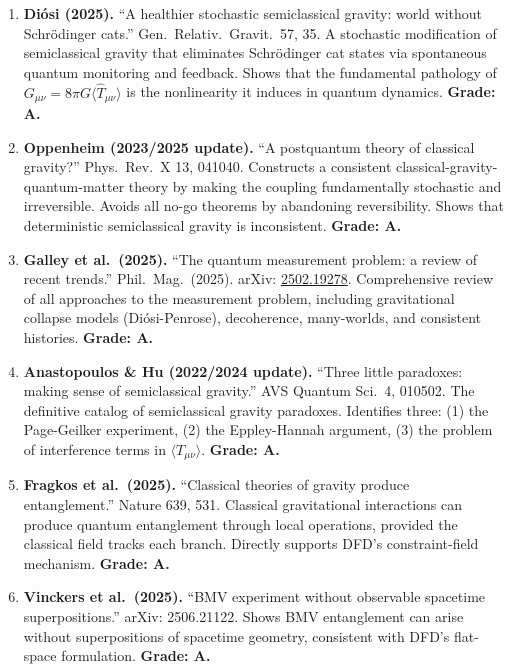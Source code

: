 \documentclass[11pt,a4paper]{article}
\begin{document}
\begin{enumerate}
\item \textbf{Di\'osi (2025).} ``A healthier stochastic semiclassical gravity: world without Schr\"odinger cats.'' Gen.\ Relativ.\ Gravit.\ 57, 35. A stochastic modification of semiclassical gravity that eliminates Schr\"odinger cat states via spontaneous quantum monitoring and feedback. Shows that the fundamental pathology of $G_{\mu\nu} = 8\pi G\langle\hat{T}_{\mu\nu}\rangle$ is the nonlinearity it induces in quantum dynamics. \textbf{Grade: A.}

\item \textbf{Oppenheim (2023/2025 update).} ``A postquantum theory of classical gravity?'' Phys.\ Rev.\ X 13, 041040. Constructs a consistent classical-gravity-quantum-matter theory by making the coupling fundamentally stochastic and irreversible. Avoids all no-go theorems by abandoning reversibility. Shows that deterministic semiclassical gravity is inconsistent. \textbf{Grade: A.}

\item \textbf{Galley et al.\ (2025).} ``The quantum measurement problem: a review of recent trends.'' Phil.\ Mag.\ (2025). arXiv: \href{https://arxiv.org/abs/2502.19278}{2502.19278}. Comprehensive review of all approaches to the measurement problem, including gravitational collapse models (Di\'osi-Penrose), decoherence, many-worlds, and consistent histories. \textbf{Grade: A.}

\item \textbf{Anastopoulos \& Hu (2022/2024 update).} ``Three little paradoxes: making sense of semiclassical gravity.'' AVS Quantum Sci.\ 4, 010502. The definitive catalog of semiclassical gravity paradoxes. Identifies three: (1) the Page-Geilker experiment, (2) the Eppley-Hannah argument, (3) the problem of interference terms in $\langle T_{\mu\nu}\rangle$. \textbf{Grade: A.}

\item \textbf{Fragkos et al.\ (2025).} ``Classical theories of gravity produce entanglement.'' Nature 639, 531. Classical gravitational interactions can produce quantum entanglement through local operations, provided the classical field tracks each branch. Directly supports DFD's constraint-field mechanism. \textbf{Grade: A.}

\item \textbf{Vinckers et al.\ (2025).} ``BMV experiment without observable spacetime superpositions.'' arXiv: 2506.21122. Shows BMV entanglement can arise without superpositions of spacetime geometry, consistent with DFD's flat-space formulation. \textbf{Grade: A.}
\end{enumerate}
\end{document}

